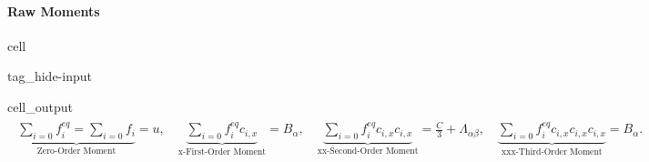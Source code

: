 \documentclass[letterpaper,10pt,english,openany,oneside]{jupyterBook}
\begin{document}
\paragraph{Raw Moments}
\label{\detokenize{LBM-Study/Convective-Diffusive-Equation:raw-moments}}
\begin{sphinxuseclass}{cell}
\begin{sphinxuseclass}{tag_hide-input}\begin{sphinxVerbatimOutput}

\begin{sphinxuseclass}{cell_output}\begin{equation*}
\begin{split}\displaystyle \begin{gathered}\underbrace{\sum_{i=0} f_{i}^{eq} =\sum_{i=0} f_{i} }_{\textrm{Zero-Order Moment}} =u,\quad \underbrace{\sum_{i=0} f_{i}^{eq}c_{i,x} }_{\textrm{x-First-Order Moment}} =B_{\alpha},\quad \underbrace{\sum_{i=0} f_{i}^{eq} c_{i,x}c_{i,x} }_{\textrm{xx-Second-Order Moment}} =\frac{C}{3} + \Lambda_{\alpha\beta},\quad \underbrace{\sum_{i=0} f_{i}^{eq} c_{i,x}c_{i,x}c_{i,x} }_{\textrm{xxx-Third-Order Moment}} =B_{\alpha}.\end{gathered}\end{split}
\end{equation*}
\end{sphinxuseclass}\end{sphinxVerbatimOutput}

\end{sphinxuseclass}
\end{sphinxuseclass}
\end{document}
